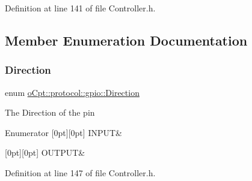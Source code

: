 Definition at line 141 of file Controller.\+h.



\subsection{Member Enumeration Documentation}
\hypertarget{classo_cpt_1_1protocol_1_1gpio_af7acf963933bbc47d11d6fa1b8ce4d5b}{}\label{classo_cpt_1_1protocol_1_1gpio_af7acf963933bbc47d11d6fa1b8ce4d5b} 
\subsubsection{\texorpdfstring{Direction}{Direction}}
{\footnotesize\ttfamily enum \hyperlink{classo_cpt_1_1protocol_1_1gpio_af7acf963933bbc47d11d6fa1b8ce4d5b}{o\+Cpt\+::protocol\+::gpio\+::\+Direction}}

The Direction of the pin \begin{DoxyEnumFields}{Enumerator}
[0pt][0pt]{}\hypertarget{classo_cpt_1_1protocol_1_1gpio_af7acf963933bbc47d11d6fa1b8ce4d5bac8229afa7339514d640fdd7512456ec1}{}\label{classo_cpt_1_1protocol_1_1gpio_af7acf963933bbc47d11d6fa1b8ce4d5bac8229afa7339514d640fdd7512456ec1} 
I\+N\+P\+UT&\\
\hline

[0pt][0pt]{}\hypertarget{classo_cpt_1_1protocol_1_1gpio_af7acf963933bbc47d11d6fa1b8ce4d5baa8f40287c9c83f0528feec4792eb1923}{}\label{classo_cpt_1_1protocol_1_1gpio_af7acf963933bbc47d11d6fa1b8ce4d5baa8f40287c9c83f0528feec4792eb1923} 
O\+U\+T\+P\+UT&\\
\hline

\end{DoxyEnumFields}


Definition at line 147 of file Controller.\+h.

\hypertarget{classo_cpt_1_1protocol_1_1gpio_adbbd34b2bc4394ad5a71d94641dda9f9}{}\label{classo_cpt_1_1protocol_1_1gpio_adbbd34b2bc4394ad5a71d94641dda9f9} 

